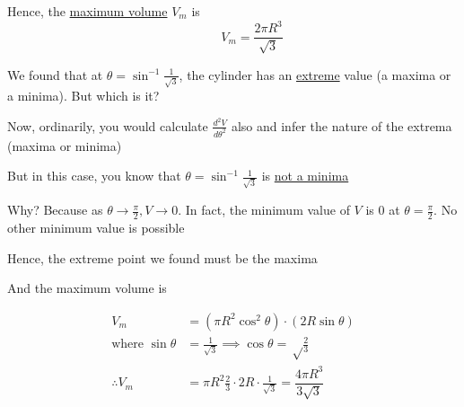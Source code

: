\documentclass[14pt,fleqn]{extarticle}
\begin{document}
Hence, the \underline{maximum volume} $V_m$ is 
\[ \quad \qquad V_m = \frac{2\pi R^3}{\sqrt{3}} \] 


\newcard 

We found that at $\theta = \sin^{-1}\frac{1}{\sqrt{3}}$, the cylinder has an 
\underline{extreme} value (a maxima or a minima). But which is it? \newline 

Now, ordinarily, you would calculate $\frac{d^2 V}{d\theta^2}$ also and infer 
the nature of the extrema (maxima or minima) \newline 

But in this case, you know that $\theta=\sin^{-1}\frac{1}{\sqrt{3}}$ is \underline{not a minima}\newline 

Why? Because as $\theta\to\frac\pi{2}, V\to 0$. In fact, the minimum value of $V$ is 0 at $\theta=\frac\pi{2}$. No other minimum value is possible \newline 

Hence, the extreme point we found must be the maxima \newline 

And the maximum volume is 

\begin{align}
	V_m &= \left(\pi R^2\cos^2\theta \right)\cdot \left( 2R\sin\theta \right) \\
	\text{where }\sin\theta &= \frac{1}{\sqrt{3}}\implies\cos\theta = \sqrt\frac{2}{3} \\
	\therefore V_m &= \pi R^2\frac{2}{3}\cdot 2 R\cdot \frac{1}{\sqrt{3}} = \dfrac{4\pi R^3}{3\sqrt{3}} 
\end{align}
\end{document}
